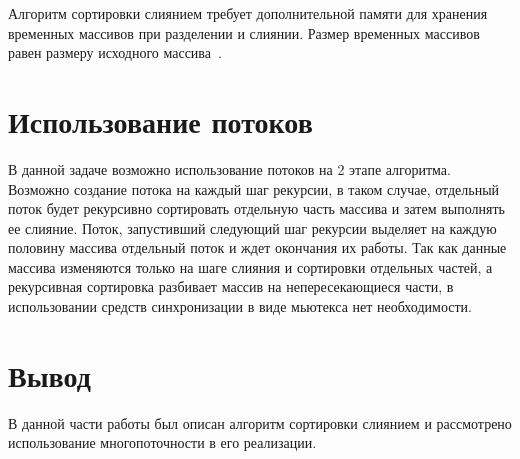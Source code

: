 Алгоритм сортировки слиянием требует дополнительной памяти для хранения временных массивов при разделении и слиянии. Размер временных массивов равен размеру исходного массива~\cite{merge-sort}.


\section{Использование потоков}
В данной задаче возможно использование потоков на 2 этапе алгоритма. Возможно создание  потока на каждый шаг рекурсии, в таком случае, 
отдельный поток будет рекурсивно сортировать отдельную часть массива  и затем выполнять ее слияние. Поток, запустивший следующий шаг рекурсии 
выделяет на каждую половину массива отдельный поток и ждет окончания их работы. Так как данные массива изменяются только на шаге слияния и сортировки отдельных частей, а рекурсивная сортировка
разбивает массив на непересекающиеся части, в использовании средств синхронизации в виде мьютекса нет необходимости.

\section*{Вывод}
В данной части работы был описан алгоритм сортировки слиянием и рассмотрено использование многопоточности в его реализации.






